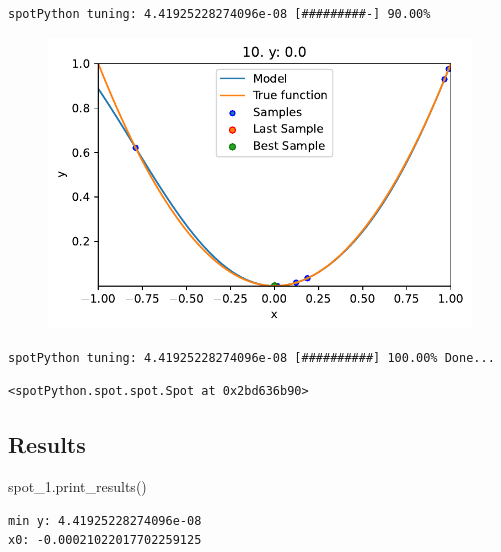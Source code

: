 \documentclass[
  letterpaper,
  DIV=11,
  numbers=noendperiod]{scrreprt}
\newenvironment{Shaded}{\begin{snugshade}}{\end{snugshade}}
\newcommand{\NormalTok}[1]{\textcolor[rgb]{0.00,0.23,0.31}{#1}}
\begin{document}
\begin{verbatim}
spotPython tuning: 4.41925228274096e-08 [#########-] 90.00% 
\end{verbatim}

\begin{figure}[H]

{\centering \includegraphics{04_spot_sklearn_surrogate_files/figure-pdf/cell-21-output-14.pdf}

}

\end{figure}

\begin{verbatim}
spotPython tuning: 4.41925228274096e-08 [##########] 100.00% Done...
\end{verbatim}

\begin{verbatim}
<spotPython.spot.spot.Spot at 0x2bd636b90>
\end{verbatim}

\hypertarget{results-2}{%
\subsection{Results}\label{results-2}}

\begin{Shaded}
\begin{Highlighting}[]
\NormalTok{spot\_1.print\_results()}
\end{Highlighting}
\end{Shaded}

\begin{verbatim}
min y: 4.41925228274096e-08
x0: -0.00021022017702259125
\end{verbatim}
\end{document}
